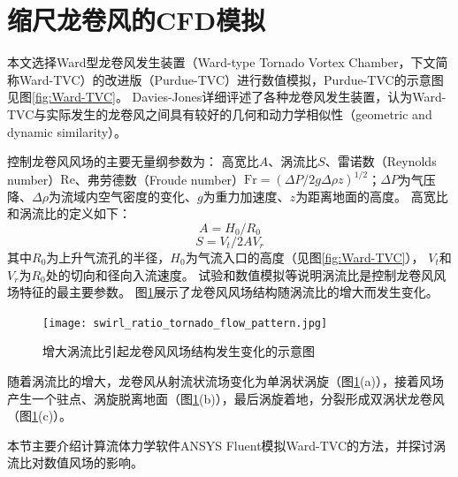 \section{缩尺龙卷风的CFD模拟}
本文选择Ward型龙卷风发生装置（Ward-type Tornado Vortex Chamber，下文简称Ward-TVC）\cite{ward1972exploration}的改进版（Purdue-TVC）\cite{church1979characteristics}进行数值模拟，Purdue-TVC的示意图见图\ref{fig:Ward-TVC}。
Davies-Jones\cite{davies1976laboratory}详细评述了各种龙卷风发生装置，认为Ward-TVC与实际发生的龙卷风之间具有较好的几何和动力学相似性（geometric and dynamic similarity）。

控制龙卷风风场的主要无量纲参数为\cite{lewellen1993tornado}：
高宽比$A$、涡流比$S$、雷诺数（Reynolds number）$\mathrm{Re}$、弗劳德数（Froude number）$\mathrm{Fr}=\left( \Delta P/ 2g\Delta \rho z\right)^{1/2}$；$\Delta P$为气压降、$\Delta \rho$为流域内空气密度的变化、$g$为重力加速度、$z$为距离地面的高度。
高宽比和涡流比的定义如下：
\begin{equation}
	A = H_0/R_0
\end{equation}
\begin{equation}
	S = V_t/2A V_r
\end{equation}
其中$R_0$为上升气流孔的半径，$H_0$为气流入口的高度（见图\ref{fig:Ward-TVC}），
$V_t$和$V_r$为$R_0$处的切向和径向入流速度。
试验\cite{ward1972exploration}\cite{church1979characteristics}\cite{snow1982review}和数值模拟\cite{davies1976laboratory}等说明涡流比是控制龙卷风风场特征的最主要参数。
图\ref{fig:swirl}展示了龙卷风风场结构随涡流比的增大而发生变化\cite{hangan2008swirl}。
\begin{figure}[!htbp]
	\centering
	\texttt{[image: swirl\_ratio\_tornado\_flow\_pattern.jpg]}
	\caption{增大涡流比引起龙卷风风场结构发生变化的示意图}\label{fig:swirl}
\end{figure}

随着涡流比的增大，龙卷风从射流状流场变化为单涡状涡旋（图\ref{fig:swirl}(a)），接着风场产生一个驻点、涡旋脱离地面（图\ref{fig:swirl}(b)），最后涡旋着地，分裂形成双涡状龙卷风（图\ref{fig:swirl}(c)）。

本节主要介绍计算流体力学软件ANSYS Fluent模拟Ward-TVC的方法，并探讨涡流比对数值风场的影响。

